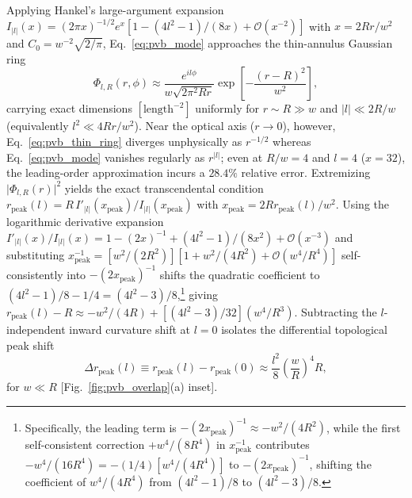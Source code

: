 \documentclass[aps,pra,reprint,nofootinbib,floatfix,longbibliography]{revtex4-2}
\theoremstyle{remark}
\newcommand{\abs}[1]{\lvert #1 \rvert}
\begin{document}
Applying Hankel's large-argument expansion $I_{\abs{l}}(x) = (2\pi x)^{-1/2} e^x [1 - (4l^2 - 1)/(8x) + \mathcal{O}(x^{-2})]$ with $x = 2Rr/w^2$ and $C_0 = w^{-2}\sqrt{2/\pi}$, Eq.~\eqref{eq:pvb_mode} approaches the thin-annulus Gaussian ring~\cite{Ferreira2026}
\begin{equation}
\Phi_{l,R}(r,\phi) \approx \frac{e^{il\phi}}{w\sqrt{2\pi^2 Rr}} \exp\!\left[-\frac{(r - R)^2}{w^2}\right],
\label{eq:pvb_thin_ring}
\end{equation}
carrying exact dimensions $[\mathrm{length}^{-2}]$ uniformly for $r \sim R \gg w$ and $\abs{l} \ll 2R/w$ (equivalently $l^2 \ll 4Rr/w^2$). Near the optical axis ($r \to 0$), however, Eq.~\eqref{eq:pvb_thin_ring} diverges unphysically as $r^{-1/2}$ whereas Eq.~\eqref{eq:pvb_mode} vanishes regularly as $r^{\abs{l}}$; even at $R/w = 4$ and $l = 4$ ($x = 32$), the leading-order approximation incurs a $28.4\%$ relative error. Extremizing $\abs{\Phi_{l,R}(r)}^2$ yields the exact transcendental condition $r_{\mathrm{peak}}(l) = R\,I'_{\abs{l}}(x_{\mathrm{peak}})/I_{\abs{l}}(x_{\mathrm{peak}})$ with $x_{\mathrm{peak}} = 2R r_{\mathrm{peak}}(l)/w^2$. Using the logarithmic derivative expansion $I'_{\abs{l}}(x)/I_{\abs{l}}(x) = 1 - (2x)^{-1} + (4l^2 - 1)/(8x^2) + \mathcal{O}(x^{-3})$ and substituting $x_{\mathrm{peak}}^{-1} = [w^2/(2R^2)][1 + w^2/(4R^2) + \mathcal{O}(w^4/R^4)]$ self-consistently into $-(2x_{\mathrm{peak}})^{-1}$ shifts the quadratic coefficient to $(4l^2 - 1)/8 - 1/4 = (4l^2 - 3)/8$,\footnote{Specifically, the leading term is $-(2x_{\mathrm{peak}})^{-1} \approx -w^2/(4R^2)$, while the first self-consistent correction $+w^4/(8R^4)$ in $x_{\mathrm{peak}}^{-1}$ contributes $-w^4/(16R^4) = -(1/4)[w^4/(4R^4)]$ to $-(2x_{\mathrm{peak}})^{-1}$, shifting the coefficient of $w^4/(4R^4)$ from $(4l^2 - 1)/8$ to $(4l^2 - 3)/8$.} giving $r_{\mathrm{peak}}(l) - R \approx -w^2/(4R) + [(4l^2 - 3)/32](w^4/R^3)$. Subtracting the $l$-independent inward curvature shift at $l = 0$ isolates the differential topological peak shift
\begin{equation}
\Delta r_{\mathrm{peak}}(l) \equiv r_{\mathrm{peak}}(l) - r_{\mathrm{peak}}(0) \approx \frac{l^2}{8}\left(\frac{w}{R}\right)^4 R,
\label{eq:peak_shift}
\end{equation}
for $w \ll R$ [Fig.~\ref{fig:pvb_overlap}(a) inset].
\end{document}
